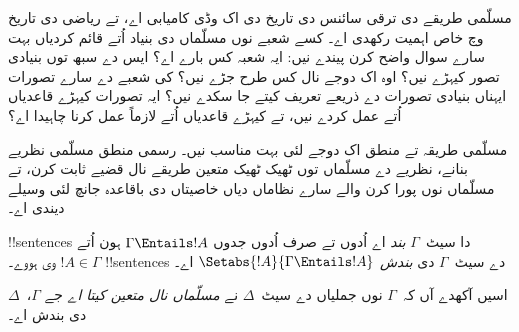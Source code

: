 \documentclass[../../../include/open-logic-section]{subfiles}
\begin{document}

\begin{explain}
مسلّمی طریقے دی ترقی سائنس دی تاریخ دی اک وڈی کامیابی اے، تے
ریاضی دی تاریخ وچ خاص اہمیت رکھدی اے۔ کسے شعبے نوں مسلّماں
دی بنیاد اُتے قائم کردیاں بہت سارے سوال واضح کرن پیندے نیں:
ایہ شعبہ کس بارے اے؟ ایس دے سبھ توں بنیادی تصور کیہڑے نیں؟
اوہ اک دوجے نال کس طرح جڑے نیں؟ کی شعبے دے سارے تصورات
ایہناں بنیادی تصورات دے ذریعے تعریف کیتے جا سکدے نیں؟ ایہ
تصورات کیہڑے قاعدیاں اُتے عمل کردے نیں، تے کیہڑے قاعدیاں اُتے
لازماً عمل کرنا چاہیدا اے؟

مسلّمی طریقہ تے منطق اک دوجے لئی بہت مناسب نیں۔ رسمی منطق
مسلّمی نظریے بنانے، نظریے دے مسلّماں توں ٹھیک ٹھیک متعین
طریقے نال قضیے ثابت کرن، تے مسلّماں نوں پورا کرن والے سارے
نظاماں دیاں خاصیتاں دی باقاعدہ جانچ لئی وسیلے دیندی اے۔
\end{explain}

\begin{defn}
!!{sentence}s دا سیٹ~$\Gamma$ \emph{بند} اے اُدوں تے صرف اُدوں
جدوں $\Gamma \Entails !A$ ہون اُتے $!A \in \Gamma$ وی ہووے۔
!!{sentence}s دے سیٹ~$\Gamma$ دی \emph{بندش}
$\Setabs{!A}{\Gamma \Entails !A}$ اے۔

اسیں آکھدے آں کہ~$\Gamma$ نوں جملیاں دے سیٹ~$\Delta$ نے
\emph{مسلّماں نال متعین کیتا اے} جے $\Gamma$،~$\Delta$ دی بندش اے۔
\end{defn}
\end{document}
